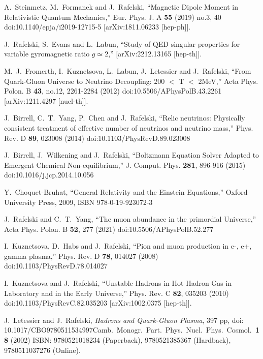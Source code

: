 \documentclass[universe,article,submit,moreauthors,pdftex,a4paper]{Definitions/mdpi}
\begin{document}
\begin{thebibliography}{99}
A.~Steinmetz, M.~Formanek and J.~Rafelski,
``Magnetic Dipole Moment in Relativistic Quantum Mechanics,''
Eur. Phys. J. A \textbf{55} (2019) no.3, 40
doi:10.1140/epja/i2019-12715-5
[arXiv:1811.06233 [hep-ph]].

J.~Rafelski, S.~Evans and L.~Labun,
``Study of QED singular properties for variable gyromagnetic ratio $g\simeq 2$,''
[arXiv:2212.13165 [hep-th]].


M.~J.~Fromerth, I.~Kuznetsova, L.~Labun, J.~Letessier and J.~Rafelski,
``From Quark-Gluon Universe to Neutrino Decoupling: 200 \ensuremath{<} T \ensuremath{<} 2MeV,''
Acta Phys. Polon. B \textbf{43}, no.12, 2261-2284 (2012)
doi:10.5506/APhysPolB.43.2261
[arXiv:1211.4297 [nucl-th]].

J.~Birrell, C.~T.~Yang, P.~Chen and J.~Rafelski,
``Relic neutrinos: Physically consistent treatment of effective number of neutrinos and neutrino mass,''
Phys. Rev. D \textbf{89}, 023008 (2014)
doi:10.1103/PhysRevD.89.023008


J.~Birrell, J.~Wilkening and J.~Rafelski,
``Boltzmann Equation Solver Adapted to Emergent Chemical Non-equilibrium,''
J. Comput. Phys. \textbf{281}, 896-916 (2015)
doi:10.1016/j.jcp.2014.10.056

Y.~Choquet-Bruhat,
``General Relativity and the Einstein Equations,''
Oxford University Press, 2009,
ISBN 978-0-19-923072-3

J.~Rafelski and C.~T.~Yang,
``The muon abundance in the primordial Universe,''
Acta Phys. Polon. B \textbf{52}, 277 (2021)
doi:10.5506/APhysPolB.52.277

I.~Kuznetsova, D.~Habs and J.~Rafelski,
``Pion and muon production in e-, e+, gamma plasma,''
Phys. Rev. D \textbf{78}, 014027 (2008)
doi:10.1103/PhysRevD.78.014027

I.~Kuznetsova and J.~Rafelski,
``Unstable Hadrons in Hot Hadron Gas in Laboratory and in the Early Universe,''
Phys. Rev. C \textbf{82}, 035203 (2010)
doi:10.1103/PhysRevC.82.035203
[arXiv:1002.0375 [hep-th]].

J.~Letessier and J.~Rafelski,
\emph{Hadrons and Quark-Gluon Plasma}, 
397 pp, doi: {10.1017/CBO9780511534997}{Camb.\ Monogr.\ Part.\ Phys.\ Nucl.\ Phys.\ Cosmol.\ {\bf 18} (2002)}
ISBN: 9780521018234 (Paperback), 9780521385367 (Hardback), 9780511037276 (Online).


\end{thebibliography}
\end{document}
